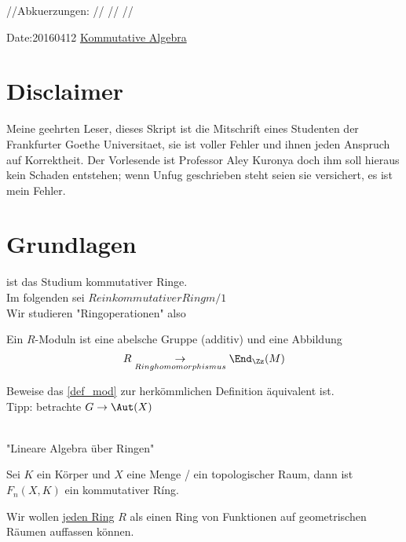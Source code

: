 //Abkuerzungen:
//\providecommand{\idealin}{dreieck nach rechts}
//\providecommand{\bzgl}{bez\"uglich}
//\providecommand{\prim}{\text{prim}}

Date:20160412
\underline{Kommutative Algebra}
\section{Disclaimer}
Meine geehrten Leser,
dieses Skript ist die Mitschrift eines Studenten der Frankfurter Goethe Universitaet, sie ist voller Fehler und ihnen jeden Anspruch auf Korrektheit.
Der Vorlesende ist Professor Aley Kuronya doch ihm soll hieraus kein Schaden entstehen; wenn Unfug geschrieben steht seien sie versichert, es ist mein Fehler.
\section{Grundlagen}
ist das Studium kommutativer Ringe.\\
Im folgenden sei \( R ein kommutativer Ring m/ 1 \) \\
Wir studieren "Ringoperationen" also  \\
\begin{defn}[Moduln] \label{def_mod}
Ein \(R\)-Moduln ist eine abelsche Gruppe (additiv) und eine Abbildung 
\[R \underset{Ringhomomorphismus}{\to} \End_\Zz(M) \]
\end{defn}
\begin{hausaufgabe}
Beweise das \ref{def_mod} zur herk\"ommlichen Definition \"aquivalent ist. \\
Tipp: betrachte \( G \to \Aut(X) \)
\end{hausaufgabe}
\\
"Lineare Algebra \"uber Ringen" \\
\begin{bsp}
Sei \( K \)  ein K\"orper und \( X \) eine Menge / ein topologischer Raum, dann ist \( F_n (X,K ) \) ein kommutativer Ríng.
\end{bsp}
\begin{Ziel}
Wir wollen \underline{jeden Ring} \( R \) als einen Ring von Funktionen auf geometrischen R\"aumen auffassen k\"onnen. \\
\end{Ziel}
